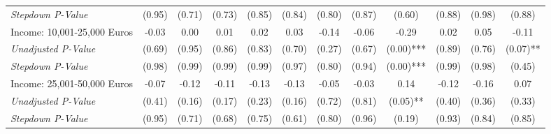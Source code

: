 \begin{tabular}{l c c c c c c c c c c c}
\quad \textit{Stepdown P-Value} & (0.95) & (0.71) & (0.73) & (0.85) & (0.84) & (0.80) & (0.87) & (0.60) & (0.88) & (0.98) & (0.88) \\
Income: 10,001-25,000 Euros & -0.03 & 0.00 & 0.01 & 0.02 & 0.03 & -0.14 & -0.06 & -0.29 & 0.02 & 0.05 & -0.11 \\
\quad \textit{Unadjusted P-Value} & (0.69) & (0.95) & (0.86) & (0.83) & (0.70) & (0.27) & (0.67) & (0.00)*** & (0.89) & (0.76) & (0.07)** \\
\quad \textit{Stepdown P-Value} & (0.98) & (0.99) & (0.99) & (0.99) & (0.97) & (0.80) & (0.94) & (0.00)*** & (0.99) & (0.98) & (0.45) \\
Income: 25,001-50,000 Euros & -0.07 & -0.12 & -0.11 & -0.13 & -0.13 & -0.05 & -0.03 & 0.14 & -0.12 & -0.16 & 0.07 \\
\quad \textit{Unadjusted P-Value} & (0.41) & (0.16) & (0.17) & (0.23) & (0.16) & (0.72) & (0.81) & (0.05)** & (0.40) & (0.36) & (0.33) \\
\quad \textit{Stepdown P-Value} & (0.95) & (0.71) & (0.68) & (0.75) & (0.61) & (0.80) & (0.96) & (0.19) & (0.93) & (0.84) & (0.85) \\
\bottomrule
\end{tabular}
